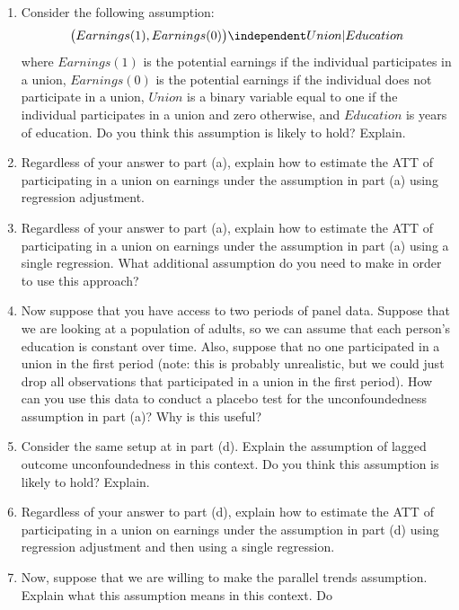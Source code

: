 \documentclass[
  letterpaper,
  DIV=11,
  numbers=noendperiod]{scrreprt}
\begin{document}
\begin{enumerate}
  \begin{enumerate}
  \def\labelenumii{\alph{enumii})}
  \item
    Consider the following assumption: \begin{align*}
       \big(Earnings(1), Earnings(0)\big) \independent Union | Education
     \end{align*} where \(Earnings(1)\) is the potential earnings if the
    individual participates in a union, \(Earnings(0)\) is the potential
    earnings if the individual does not participate in a union,
    \(Union\) is a binary variable equal to one if the individual
    participates in a union and zero otherwise, and \(Education\) is
    years of education. Do you think this assumption is likely to hold?
    Explain.
  \item
    Regardless of your answer to part (a), explain how to estimate the
    ATT of participating in a union on earnings under the assumption in
    part (a) using regression adjustment.
  \item
    Regardless of your answer to part (a), explain how to estimate the
    ATT of participating in a union on earnings under the assumption in
    part (a) using a single regression. What additional assumption do
    you need to make in order to use this approach?
  \item
    Now suppose that you have access to two periods of panel data.
    Suppose that we are looking at a population of adults, so we can
    assume that each person's education is constant over time. Also,
    suppose that no one participated in a union in the first period
    (note: this is probably unrealistic, but we could just drop all
    observations that participated in a union in the first period). How
    can you use this data to conduct a placebo test for the
    unconfoundedness assumption in part (a)? Why is this useful?
  \item
    Consider the same setup at in part (d). Explain the assumption of
    lagged outcome unconfoundedness in this context. Do you think this
    assumption is likely to hold? Explain.
  \item
    Regardless of your answer to part (d), explain how to estimate the
    ATT of participating in a union on earnings under the assumption in
    part (d) using regression adjustment and then using a single
    regression.
  \item
    Now, suppose that we are willing to make the parallel trends
    assumption. Explain what this assumption means in this context. Do

\end{enumerate}
\end{enumerate}
\end{document}
